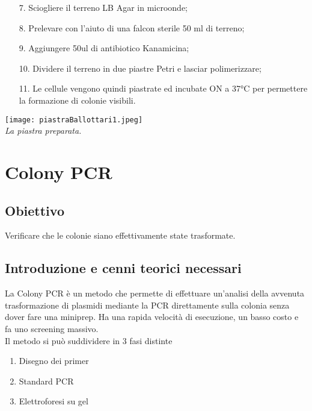 \documentclass{extarticle}
\begin{document}
\begin{minipage}{0.50\textwidth} 
    \begin{enumerate}
        \item[7.] Sciogliere il terreno LB Agar in microonde;
        \item[8.] Prelevare con l'aiuto di una falcon sterile 50 ml di terreno;
        \item[9.] Aggiungere 50ul di antibiotico Kanamicina;
        \item[10.] Dividere il terreno in due piastre Petri e lasciar polimerizzare;
        \item[11.] Le cellule vengono quindi piastrate ed incubate ON a 37°C per permettere la formazione di colonie visibili.
    \end{enumerate}
    \begin{center}
        \texttt{[image: piastraBallottari1.jpeg]}\\
        \emph{La piastra preparata.}
    \end{center}
\end{minipage}

\newpage
\section{Colony PCR}
\subsection*{Obiettivo}
Verificare che le colonie siano effettivamente state trasformate.
\subsection*{Introduzione e cenni teorici necessari}
La Colony PCR è un metodo che permette di effettuare un'analisi della avvenuta trasformazione di  plasmidi mediante la PCR 
direttamente sulla colonia senza dover fare una miniprep. Ha una rapida velocità di esecuzione, un basso costo e fa uno screening massivo.\\
Il metodo si può suddividere in 3 fasi distinte
\begin{enumerate}
    \item Disegno dei primer
    \item Standard PCR
    \item Elettroforesi su gel
\end{enumerate}
\end{document}
